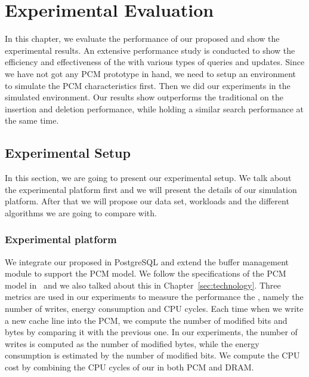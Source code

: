 \chapter{Experimental Evaluation}
\label{sec:experiment}


In this chapter, we evaluate the performance of our proposed
\bptree and show the experimental results. An extensive performance study is conducted to show the
efficiency and effectiveness of the \bptree with various types of
queries and updates. Since we have not got any PCM prototype in hand, we need to setup an environment
to simulate the PCM characteristics first. Then we did our experiments in the simulated environment.
Our results show \bptree outperforms the traditional \bplustree on the insertion and deletion performance,
while holding a similar search performance at the same time.

\section{Experimental Setup}

In this section, we are going to present our experimental setup. We talk about the
experimental platform first and we will present the details of our simulation platform.
After that we will propose our data set, workloads and the different algorithms we are going to compare with.

\subsection{Experimental platform}

We integrate our proposed
\bptree in PostgreSQL and extend the buffer management module to
support the PCM model. We follow the specifications of the PCM
model in~\cite{chen2011rethinking} and we also talked about this in Chapter~\ref{sec:technology}.
Three metrics are used in our
experiments to measure the performance the \bptree, namely the
number of writes, energy consumption and CPU cycles.
%
Each time when we write a new cache line into the PCM, we compute the number
of modified bits and bytes by comparing it with the previous one.
In our experiments, the number of writes is computed as the
number of modified bytes, while the energy consumption is estimated
by the number of modified bits. We compute the CPU cost by
combining the CPU cycles of our \bptree in both PCM and DRAM.

